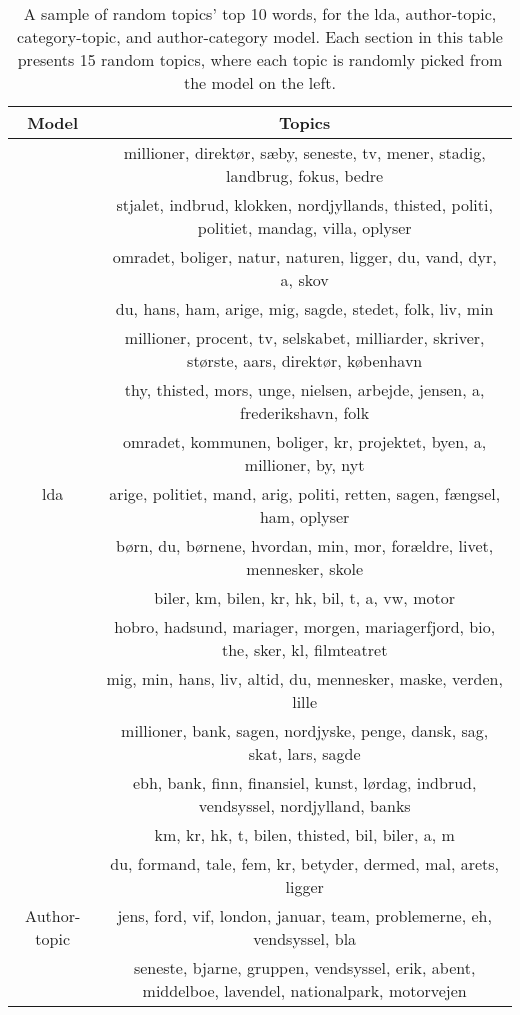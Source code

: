 \begin{table}
	\caption{A sample of random topics' top 10 words, for the \gls{lda}, author-topic, category-topic, and author-category model. 
	Each section in this table presents 15 random topics, where each topic is randomly picked from the model on the left.}
	\label{tab:all_gibbs_topic_examples}
	\centering
	\begin{tabular}{c|c}
		Model & Topics \\
		\midrule
		\multirow{15}{*}{\gls{lda}} & millioner, direktør, sæby, seneste, tv, mener, stadig, landbrug, fokus, bedre \\
		& stjalet, indbrud, klokken, nordjyllands, thisted, politi, politiet, mandag, villa, oplyser \\
		& omradet, boliger, natur, naturen, ligger, du, vand, dyr, a, skov \\
		& du, hans, ham, arige, mig, sagde, stedet, folk, liv, min \\
		& millioner, procent, tv, selskabet, milliarder, skriver, største, aars, direktør, københavn \\
		& thy, thisted, mors, unge, nielsen, arbejde, jensen, a, frederikshavn, folk \\
		& omradet, kommunen, boliger, kr, projektet, byen, a, millioner, by, nyt \\
		& arige, politiet, mand, arig, politi, retten, sagen, fængsel, ham, oplyser \\
		& børn, du, børnene, hvordan, min, mor, forældre, livet, mennesker, skole \\
		& biler, km, bilen, kr, hk, bil, t, a, vw, motor \\
		& hobro, hadsund, mariager, morgen, mariagerfjord, bio, the, sker, kl, filmteatret \\
		& mig, min, hans, liv, altid, du, mennesker, maske, verden, lille \\
		& millioner, bank, sagen, nordjyske, penge, dansk, sag, skat, lars, sagde \\
		& ebh, bank, finn, finansiel, kunst, lørdag, indbrud, vendsyssel, nordjylland, banks \\
		& km, kr, hk, t, bilen, thisted, bil, biler, a, m \\
		\midrule
		\multirow{15}{*}{Author-topic} & du, formand, tale, fem, kr, betyder, dermed, mal, arets, ligger \\
		& jens, ford, vif, london, januar, team, problemerne, eh, vendsyssel, bla \\
		& seneste, bjarne, gruppen, vendsyssel, erik, abent, middelboe, lavendel, nationalpark, motorvejen \\

\end{tabular}
\end{table}
